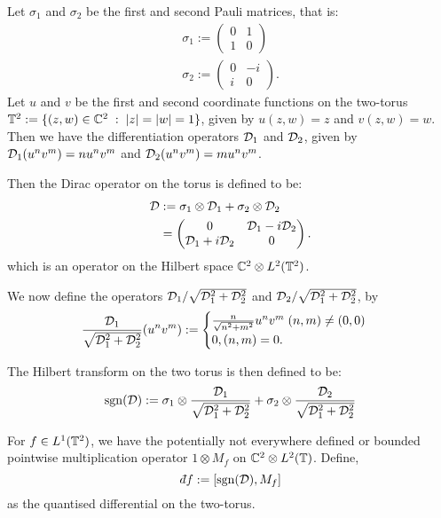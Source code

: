 \begin{definition}
\label{twoDirac}
    Let $\sigma_1$ and $\sigma_2$ be the first and second
    Pauli matrices, that is:
    \begin{align*}
        \sigma_1 := \begin{pmatrix}
            0 & 1\\
            1 & 0
        \end{pmatrix}\\
        \sigma_2 := \begin{pmatrix}
            0 & -i\\
            i & 0
        \end{pmatrix}.
    \end{align*}
    Let $u$ and $v$ be the first and second coordinate
    functions on the two-torus $\mathbb{T}^2 := \{(z,w) \in \mathbb{C}^2\;:\;|z| = |w| = 1\}$,
    given by $u(z,w) = z$ and $v(z,w) = w$. Then we have the differentiation
    operators $\mathcal{D}_1$ and $\mathcal{D}_2$, given by $\mathcal{D}_1(u^nv^m) = nu^nv^m$
    and $\mathcal{D}_2(u^nv^m) = mu^nv^m$.
    
    Then the Dirac operator on the torus is defined to be:
    \begin{align*}
        \mathcal{D} &:= \sigma_1 \otimes \mathcal{D}_1 + \sigma_2 \otimes \mathcal{D}_2\\
        &= \begin{pmatrix}
            0 & \mathcal{D}_1-i\mathcal{D}_2\\
            \mathcal{D}_1 + i\mathcal{D}_2 & 0
        \end{pmatrix}.
    \end{align*}
    which is an operator on the Hilbert space $\mathbb{C}^2 \otimes L^2(\mathbb{T}^2)$.
    
    We now define the operators $\mathcal{D}_1/\sqrt{\mathcal{D}_1^2+\mathcal{D}_2^2}$ and $\mathcal{D}_2/\sqrt{\mathcal{D}_1^2+\mathcal{D}_2^2}$,
    by
    \begin{equation}
        \frac{\mathcal{D}_1}{\sqrt{\mathcal{D}_1^2+\mathcal{D}_2^2}} (u^nv^m) := \begin{cases}
                                                        \frac{n}{\sqrt{n^2+m^2}}u^nv^m\;(n,m)\neq (0,0)\\
                                                        0,(n,m) = 0.
                                                      \end{cases}
    \end{equation}
    
    The Hilbert transform on the two torus is then defined to be:
    \begin{equation}
        \operatorname{sgn}(\mathcal{D}) := \sigma_1 \otimes \frac{\mathcal{D}_1}{\sqrt{\mathcal{D}_1^2+\mathcal{D}_2^2}} + \sigma_2 \otimes \frac{\mathcal{D}_2}{\sqrt{\mathcal{D}_1^2+\mathcal{D}_2^2}}
    \end{equation}
    
    For $f \in L^1(\mathbb{T}^2)$, we have the potentially not everywhere defined
    or bounded pointwise multiplication operator $1\otimes M_f$
    on $\mathbb{C}^2\otimes L^2(\mathbb{T})$. Define,
    \begin{equation}
        \qd f := [\sgn(\D),M_f]
    \end{equation}    
    as the quantised differential on the two-torus.
\end{definition}

